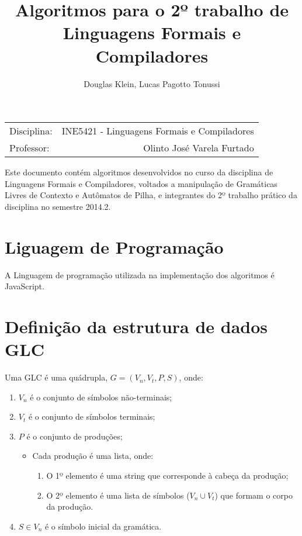 \documentclass[12pt]{article}
\title{Algoritmos para o 2º trabalho de Linguagens Formais e Compiladores}
\author{Douglas Klein\inst{1}, Lucas Pagotto Tonussi\inst{1}}
\begin{document}
\maketitle

\begin{center}
\begin{tabular}{l r}
Disciplina: & INE5421 - Linguagens Formais e Compiladores\\ Professor: & Olinto
José Varela Furtado
\end{tabular}
\end{center}

\begin{resumo}
Este documento contém algoritmos desenvolvidos no curso da disciplina de
Linguagens Formais e Compiladores, voltados a manipulação de Gramáticas Livres
de Contexto e Autômatos de Pilha, e integrantes do 2º trabalho prático da
disciplina no semestre 2014.2.
\end{resumo}

\section{Liguagem de Programação}
A Linguagem de programação utilizada na implementação dos algoritmos é JavaScript.

\section{Definição da estrutura de dados GLC}
Uma GLC é uma quádrupla, $G=(V_n, V_t, P, S)$, onde:
\begin{enumerate}
	\item $V_n$ é o conjunto de símbolos não-terminais;
	\item $V_t$ é o conjunto de símbolos terminais;
	\item $P$ é o conjunto de produções;
		\begin{itemize}
			\item Cada produção é uma lista, onde:
				\begin{enumerate}
					\item O 1º elemento é uma string que corresponde à cabeça da produção;
					\item O 2º elemento é uma lista de símbolos ($V_n \cup V_t$) que formam o corpo da produção.
				\end{enumerate}
		\end{itemize}
	\item $S \in V_n$ é o símbolo inicial da gramática.
\end{enumerate}
\end{document}
